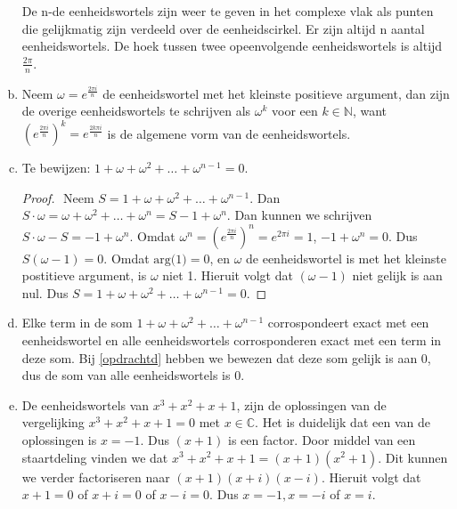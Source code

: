 \documentclass[12pt, a4paper]{article}
\begin{document}
\begin{enumerate}[(a).]
    De n-de eenheidswortels zijn weer te geven in het complexe vlak als punten die gelijkmatig zijn verdeeld over de eenheidscirkel. Er zijn altijd n aantal eenheidswortels. De hoek tussen twee opeenvolgende eenheidswortels is altijd $\frac{2\pi}{n}$.

    \item 
    Neem $\omega = e^{\frac{2\pi i}{n}}$ de eenheidswortel met het kleinste positieve argument, dan zijn de overige eenheidswortels te schrijven als $\omega^k$ voor een $k \in \mathbb{N}$, want ${(e^{\frac{2\pi i}{n}})}^k = e^{\frac{2k\pi i}{n}}$ is de algemene vorm van de eenheidswortels.
    \newpage
    \item \label{opdrachtd}
    Te bewijzen: $1 + \omega + \omega^2 + \dots + \omega^{n - 1} = 0$.

    \begin{proof}
        $ $\newline
        Neem $S = 1 + \omega + \omega^2 + \dots + \omega^{n - 1}$. \newline
        Dan $S \cdot \omega = \omega + \omega^2 + \dots + \omega^n = S - 1 + \omega^n$. \newline
        Dan kunnen we schrijven $S\cdot \omega - S = -1 + \omega^n$. \newline
        Omdat $\omega^n = {(e^{\frac{2\pi i}{n}})}^n = e^{2\pi i} = 1$, $-1 + \omega^n = 0$. \newline
        Dus $S(\omega - 1) = 0$. \newline 
        Omdat $\text{arg(1)}= 0$, en $\omega$ de eenheidswortel is met het kleinste postitieve argument, is $\omega$ niet 1. \newline Hieruit volgt dat $(\omega - 1)$ niet gelijk is aan nul. \newline Dus $S = 1 + \omega + \omega^2 + \dots + \omega^{n - 1} = 0$.
    \end{proof}

    \item 
    Elke term in de som $1 + \omega + \omega^2 + \dots + \omega^{n - 1}$ corrospondeert exact met een eenheidswortel en alle eenheidswortels corrosponderen exact met een term in deze som. Bij \ref{opdrachtd} \!hebben we bewezen dat deze som gelijk is aan 0, dus de som van alle eenheidswortels is 0.
    
    \item 
    De eenheidswortels van $x^3+x^2+x+1$, zijn de oplossingen van de vergelijking $x^3+x^2+x+1=0$ met $x \in \mathbb{C}$.
    Het is duidelijk dat een van de oplossingen is $x=-1$. Dus $(x+1)$ is een factor. Door middel van een staartdeling vinden we dat    $x^3+x^2+x+1=(x+1)(x^2+1)$. Dit kunnen we verder factoriseren naar $(x+1)(x+i)(x-i)$. Hieruit volgt dat $x+1=0$ of $x+i=0$ of $x-i=0$. Dus $x=-1, x=-i$ of $x=i$.
    

\end{enumerate}
\end{document}
